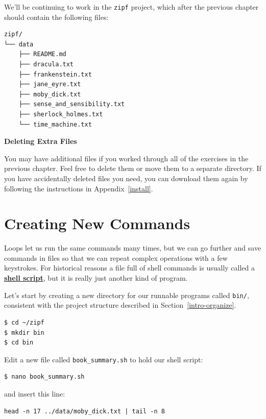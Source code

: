 \documentclass[
]{krantz}
\renewenvironment{quote}{\begin{VF}}{\end{VF}}
\newcommand{\gref}[2]{\hyperlink{#2}{\textbf{#1}}}
\begin{document}
We'll be continuing to work in the \texttt{zipf} project,
which after the previous chapter should contain the following files:

\begin{verbatim}
zipf/
└── data
    ├── README.md
    ├── dracula.txt
    ├── frankenstein.txt
    ├── jane_eyre.txt
    ├── moby_dick.txt
    ├── sense_and_sensibility.txt
    ├── sherlock_holmes.txt
    └── time_machine.txt
\end{verbatim}

\begin{quote}
\textbf{Deleting Extra Files}

You may have additional files
if you worked through all of the exercises in the previous chapter.
Feel free to delete them or move them to a separate directory.
If you have accidentally deleted files you need,
you can download them again by following the instructions in Appendix~\ref{install}.
\end{quote}

\hypertarget{bash-advanced-script}{%
\section{Creating New Commands}\label{bash-advanced-script}}

Loops let us run the same commands many times,
but we can go further and save commands in files
so that we can repeat complex operations with a few keystrokes.
For historical reasons
a file full of shell commands is usually called a \gref{shell script}{shell\_script},
but it is really just another kind of program.

Let's start by creating a new directory for our runnable programs called \texttt{bin/},
consistent with the project structure described in Section~\ref{intro-organize}.

\begin{verbatim}
$ cd ~/zipf
$ mkdir bin
$ cd bin
\end{verbatim}

Edit a new file called \texttt{book\_summary.sh} to hold our shell script:

\begin{verbatim}
$ nano book_summary.sh
\end{verbatim}

and insert this line:

\begin{verbatim}
head -n 17 ../data/moby_dick.txt | tail -n 8
\end{verbatim}
\end{document}
